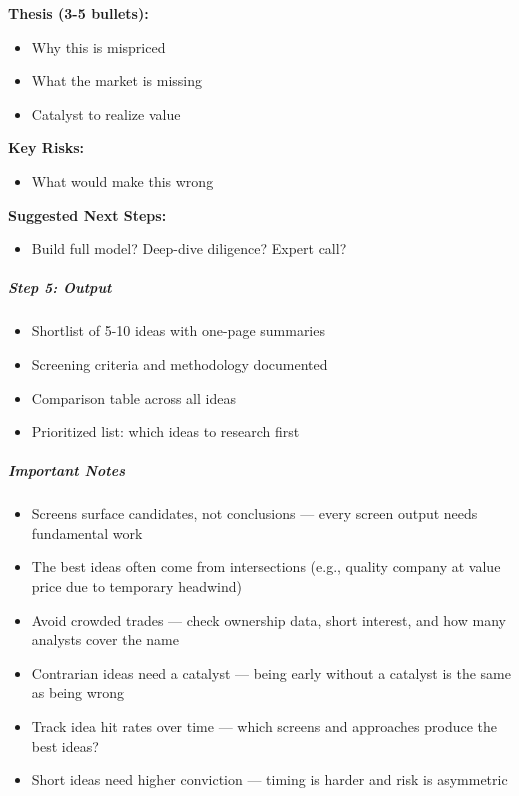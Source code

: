 \documentclass[11pt]{article}
\begin{document}
\textbf{Thesis (3-5 bullets):}

\begin{itemize}[leftmargin=*,itemsep=2pt,topsep=2pt]
\item {} Why this is mispriced
\item {} What the market is missing
\item {} Catalyst to realize value
\end{itemize}

\textbf{Key Risks:}

\begin{itemize}[leftmargin=*,itemsep=2pt,topsep=2pt]
\item {} What would make this wrong
\end{itemize}

\textbf{Suggested Next Steps:}

\begin{itemize}[leftmargin=*,itemsep=2pt,topsep=2pt]
\item {} Build full model? Deep-dive diligence? Expert call?
\end{itemize}

\subparagraph{Step 5: Output}\mbox{}\par

\begin{itemize}[leftmargin=*,itemsep=2pt,topsep=2pt]
\item {} Shortlist of 5-10 ideas with one-page summaries
\item {} Screening criteria and methodology documented
\item {} Comparison table across all ideas
\item {} Prioritized list: which ideas to research first
\end{itemize}

\subparagraph{Important Notes}\mbox{}\par

\begin{itemize}[leftmargin=*,itemsep=2pt,topsep=2pt]
\item {} Screens surface candidates, not conclusions — every screen output needs fundamental work
\item {} The best ideas often come from intersections (e.g., quality company at value price due to temporary headwind)
\item {} Avoid crowded trades — check ownership data, short interest, and how many analysts cover the name
\item {} Contrarian ideas need a catalyst — being early without a catalyst is the same as being wrong
\item {} Track idea hit rates over time — which screens and approaches produce the best ideas?
\item {} Short ideas need higher conviction — timing is harder and risk is asymmetric
\end{itemize}
\end{document}
